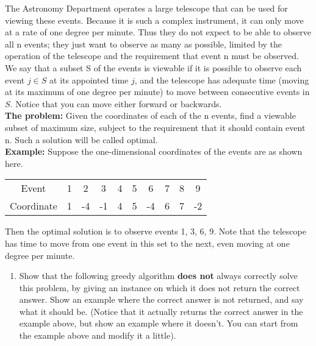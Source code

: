 \documentclass[letterpaper, 11pt]{article}
\begin{document}
\begin{enumerate}
    The Astronomy Department operates a large telescope that can be used for viewing these events. Because it is such a complex instrument, it can only move at a rate of one degree per minute. Thus they do not expect to be able to observe all n events; they just want to observe as many as possible, limited by the operation of the telescope and the requirement that event n must be observed. We say that a subset S of the events is viewable if it is possible to observe each event $j \in S$ at its appointed time $j$, and the telescope has adequate time (moving at its maximum of one degree per minute) to move between consecutive events in $S$. Notice that you can move either forward or backwards.\\
    \textbf{The problem:} Given the coordinates of each of the n events, find a viewable subset of maximum size, subject to the requirement that it should contain event n. Such a solution will be called optimal.\\
    \textbf{Example:} Suppose the one-dimensional coordinates of the events are as shown here.
    \begin{table}[H]
        \centering
        \begin{tabular}{cccccccccc}
            \hline
            Event & 1 & 2 & 3 & 4 & 5 & 6 & 7 & 8 & 9  \\
            Coordinate & 1 & -4 & -1 & 4 & 5 & -4 & 6 & 7 & -2\\
            \hline
        \end{tabular}
    \end{table}

    Then the optimal solution is to observe events 1, 3, 6, 9. Note that the telescope has time to move from one event in this set to the next, even moving at one degree per minute.

    \begin{enumerate}
        \item Show that the following greedy algorithm \textbf{does not} always correctly solve this problem, by giving an instance on which it does not return the correct answer. Show an example where the correct answer is not returned, and say what it should be. (Notice that it actually returns the correct answer in the example above, but show an example where it doesn’t. You can start from the example above and modify it a little).


\end{enumerate}
\end{enumerate}
\end{document}
